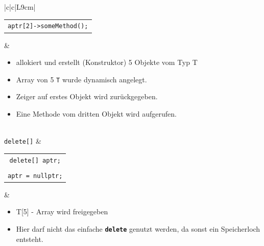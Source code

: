 \documentclass[a4paper]{report}
\begin{document}
\begin{center}
\begin{tabular}{|c|c|L{9cm}|}
\begin{tabular}{c}
			\texttt{aptr[2]->someMethod();}
		\end{tabular} &
		\begin{itemize}
			\item allokiert und erstellt (Konstruktor) 5 Objekte vom Typ T
			\item Array von 5 \texttt{T} wurde dynamisch angelegt.
			\item Zeiger auf erstes Objekt wird zurückgegeben.
			\item Eine Methode vom dritten Objekt wird aufgerufen.
		\end{itemize} \\ \hline
		\texttt{delete[]} &  \begin{tabular}{c}
			\texttt{delete[] aptr;} \\ \\
			\texttt{aptr = nullptr;}
			\end{tabular} &
		\begin{itemize}
			\item T[5] - Array wird freigegeben
			\item Hier darf nicht das einfache \texttt{\textbf{delete}} genutzt werden, da sonst ein Speicherloch entsteht.
		\end{itemize} \\ \hline
		
		
	\end{tabular}
\end{center}
\end{document}
